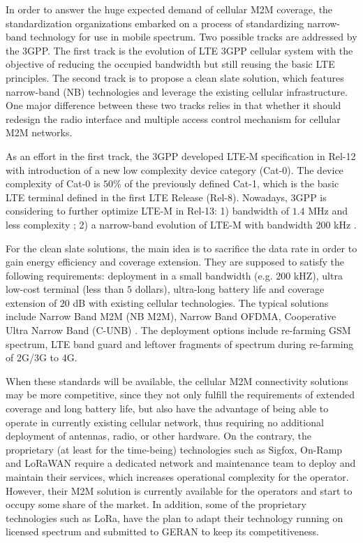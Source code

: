 In order to answer the huge expected demand of cellular M2M coverage, the standardization organizations embarked on a process of standardizing narrow-band technology for use in mobile spectrum. Two possible tracks are addressed by the 3GPP. The first track is the evolution of LTE 3GPP cellular system with the objective of reducing the occupied bandwidth but still reusing the basic LTE principles. The second track is to propose a clean slate solution, which features narrow-band (NB) technologies and leverage the existing cellular infrastructure. One major difference between these two tracks relies in that whether it should redesign the radio interface and multiple access control mechanism for cellular M2M networks. 

As an effort in the first track, the 3GPP developed LTE-M specification in Rel-12 \cite{Nokia15} with introduction of a new low complexity device category (Cat-0). The device complexity of Cat-0 is $50$\% of the previously defined Cat-1, which is the basic LTE terminal defined in the first LTE Release (Rel-8). Nowadays, 3GPP is considering to further optimize LTE-M in Rel-13: 1) bandwidth of $1.4$ MHz and less complexity \cite{Nokia15}; 2) a narrow-band evolution of LTE-M with bandwidth $200$ kHz \cite{ratasuk2014narrowband}. 

For the clean slate solutions, the main idea is to sacrifice the data rate in order to gain energy efficiency and coverage extension. They are supposed to satisfy the following requirements: deployment in a small bandwidth (e.g. $200$ kHZ), ultra low-cost terminal (less than $5$ dollars), ultra-long battery life and coverage extension of $20$ dB with existing cellular technologies. The typical solutions include Narrow Band M2M (NB M2M), Narrow Band OFDMA, Cooperative Ultra Narrow Band (C-UNB) \cite{3GPP/cellularIoT}. The deployment options include re-farming GSM spectrum, LTE band guard and leftover fragments of spectrum during re-farming of 2G/3G to 4G. 

When these standards will be available, the cellular M2M connectivity solutions may be more competitive, since they not only fulfill the requirements of extended coverage and long battery life, but also have the advantage of being able to operate in currently existing cellular network, thus requiring no additional deployment of antennas, radio, or other hardware. On the contrary, the proprietary (at least for the time-being) technologies such as Sigfox, On-Ramp and LoRaWAN require a dedicated network and maintenance team to deploy and maintain their services, which increases operational complexity for the operator. However, their M2M solution is currently available for the operators and start to occupy some share of the market. In addition, some of the proprietary technologies such as LoRa, have the plan to adapt their technology running on licensed spectrum and submitted to GERAN \cite{xonapartners:shaping}  to keep its competitiveness. 

